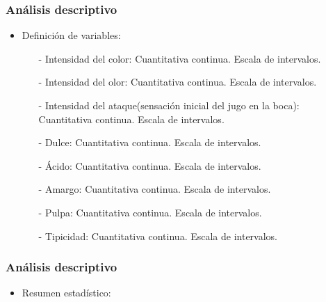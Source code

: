 \documentclass[12pt]{beamer}
\begin{document}
\begin{frame}
\frametitle{Análisis descriptivo}
\begin{itemize}
\item Definición de variables:
\begin{itemize}
\item[-]Intensidad del color: Cuantitativa continua. Escala de intervalos.
\item[-]Intensidad del olor: Cuantitativa continua. Escala de intervalos.
\item[-]Intensidad del ataque(sensación inicial del jugo en la boca): Cuantitativa continua. Escala de intervalos.
\item[-]Dulce: Cuantitativa continua. Escala de intervalos.
\item[-]Ácido: Cuantitativa continua. Escala de intervalos.
\item[-]Amargo: Cuantitativa continua. Escala de intervalos.
\item[-]Pulpa: Cuantitativa continua. Escala de intervalos.
\item[-]Tipicidad: Cuantitativa continua. Escala de intervalos.
\end{itemize}
\end{itemize}
\end{frame}


\begin{frame}
\frametitle{Análisis descriptivo}
\begin{itemize}
\item Resumen estadístico:
\end{itemize}
\begin{center}
\end{center}
\end{frame}
\end{document}
